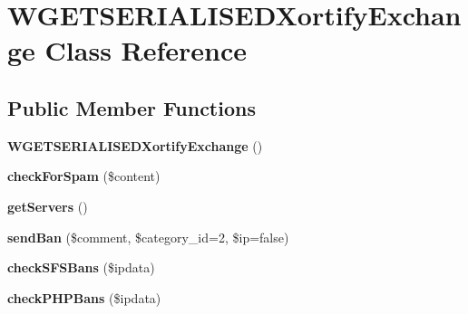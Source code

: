\hypertarget{class_w_g_e_t_s_e_r_i_a_l_i_s_e_d_xortify_exchange}{\section{W\-G\-E\-T\-S\-E\-R\-I\-A\-L\-I\-S\-E\-D\-Xortify\-Exchange Class Reference}
\label{class_w_g_e_t_s_e_r_i_a_l_i_s_e_d_xortify_exchange}
}
\subsection*{Public Member Functions}
\begin{DoxyCompactItemize}
\item 
\hypertarget{class_w_g_e_t_s_e_r_i_a_l_i_s_e_d_xortify_exchange_a01a64763f4983c5d16db5b686c13b52e}{{\bfseries W\-G\-E\-T\-S\-E\-R\-I\-A\-L\-I\-S\-E\-D\-Xortify\-Exchange} ()}\label{class_w_g_e_t_s_e_r_i_a_l_i_s_e_d_xortify_exchange_a01a64763f4983c5d16db5b686c13b52e}

\item 
\hypertarget{class_w_g_e_t_s_e_r_i_a_l_i_s_e_d_xortify_exchange_a7a4f53c3841dc7806455261af557d514}{{\bfseries check\-For\-Spam} (\$content)}\label{class_w_g_e_t_s_e_r_i_a_l_i_s_e_d_xortify_exchange_a7a4f53c3841dc7806455261af557d514}

\item 
\hypertarget{class_w_g_e_t_s_e_r_i_a_l_i_s_e_d_xortify_exchange_a882f365bc81e207dc2123ef707735e82}{{\bfseries get\-Servers} ()}\label{class_w_g_e_t_s_e_r_i_a_l_i_s_e_d_xortify_exchange_a882f365bc81e207dc2123ef707735e82}

\item 
\hypertarget{class_w_g_e_t_s_e_r_i_a_l_i_s_e_d_xortify_exchange_a0293acfa4afe0cb5b2816352a35d8ca7}{{\bfseries send\-Ban} (\$comment, \$category\-\_\-id=2, \$ip=false)}\label{class_w_g_e_t_s_e_r_i_a_l_i_s_e_d_xortify_exchange_a0293acfa4afe0cb5b2816352a35d8ca7}

\item 
\hypertarget{class_w_g_e_t_s_e_r_i_a_l_i_s_e_d_xortify_exchange_a985a563a84e3e5c54694fcce192bda53}{{\bfseries check\-S\-F\-S\-Bans} (\$ipdata)}\label{class_w_g_e_t_s_e_r_i_a_l_i_s_e_d_xortify_exchange_a985a563a84e3e5c54694fcce192bda53}

\item 
\hypertarget{class_w_g_e_t_s_e_r_i_a_l_i_s_e_d_xortify_exchange_aeb1bf9aaee4718870adbd07333490aaf}{{\bfseries check\-P\-H\-P\-Bans} (\$ipdata)}\label{class_w_g_e_t_s_e_r_i_a_l_i_s_e_d_xortify_exchange_aeb1bf9aaee4718870adbd07333490aaf}


\end{DoxyCompactItemize}
